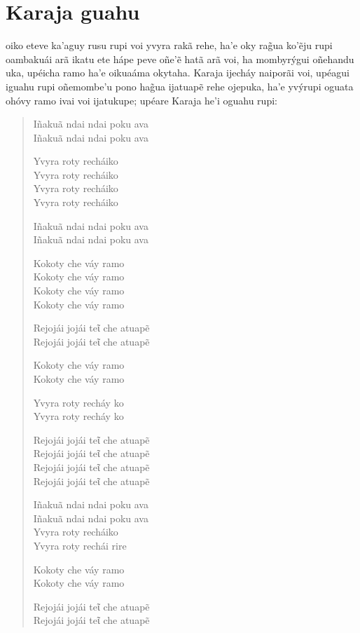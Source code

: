 \chapter{Karaja guahu}

 oiko eteve ka'aguy rusu rupi voi yvyra rakã rehe, ha'e oky rag̃ua
ko'ẽju rupi oambakuái arã ikatu ete hápe peve oñe'ẽ hatã arã voi, ha
mombyrýgui oñehandu uka, upéicha ramo ha'e oikuaáma okytaha. Karaja
ijecháy naiporãi voi, upéagui iguahu rupi oñemombe'u pono hag̃ua ijatuapẽ
rehe ojepuka, ha'e yvýrupi oguata ohóvy ramo ivai voi ijatukupe; upéare
Karaja he'i oguahu rupi:

\begin{verse}
Iñakuã ndai ndai poku ava\\
Iñakuã ndai ndai poku ava

Yvyra roty recháiko\\
Yvyra roty recháiko\\
Yvyra roty recháiko\\
Yvyra roty recháiko

Iñakuã ndai ndai poku ava\\
Iñakuã ndai ndai poku ava

Kokoty che váy ramo\\
Kokoty che váy ramo\\
Kokoty che váy ramo\\
Kokoty che váy ramo

Rejojái jojái teῖ che atuapẽ\\
Rejojái jojái teῖ che atuapẽ

\pagebreak
Kokoty che váy ramo\\
Kokoty che váy ramo

Yvyra roty recháy ko\\
Yvyra roty recháy ko

Rejojái jojái teῖ che atuapẽ\\
Rejojái jojái teῖ che atuapẽ\\
Rejojái jojái teῖ che atuapẽ\\
Rejojái jojái teῖ che atuapẽ

Iñakuã ndai ndai poku ava\\
Iñakuã ndai ndai poku ava\\
Yvyra roty recháiko\\
Yvyra roty rechái rire

Kokoty che váy ramo\\
Kokoty che váy ramo

Rejojái jojái teῖ che atuapẽ\\
Rejojái jojái teῖ che atuapẽ
\end{verse}

